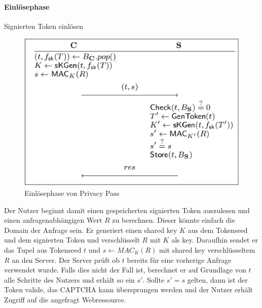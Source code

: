 \documentclass[11pt,a4paper]{scrreprt}
\begin{document}
\paragraph{Einlösephase} Signierten Token einlösen\\
\begin{figure}[H]
    \centering
    \includegraphics[width=0.5\linewidth]{pp-redemptionphase.png} 
    \caption{Einlösephase von Privacy Pass \cite{pp-davidson2018privacy}}
    \label{fig:pp-redemptoinphase}
\end{figure}
Der Nutzer beginnt damit einen gespeicherten signierten Token auszulesen und einen anfragenabhängigen Wert $R$ zu berechnen. Dieser könnte einfach die Domain der Anfrage sein. Er generiert einen shared key $K$ aus dem Tokenseed und dem signierten Token und verschlüsselt $R$ mit $K$ als key. Daraufhin sendet er das Tupel aus Tokenseed $t$ und $s\leftarrow MAC_{K}(R)$ mit shared key verschlüsseltem $R$ an den Server. Der Server prüft ob $t$ bereits für eine vorherige Anfrage verwendet wurde. Falls dies nicht der Fall ist, berechnet er auf Grundlage von $t$ alle Schritte des Nutzers und erhält so ein $s'$. Sollte $s'=s$ gelten, dann ist der Token valide, das CAPTCHA kann übersprungen werden und der Nutzer erhält Zugriff auf die angefragt Webressource.
\end{document}
